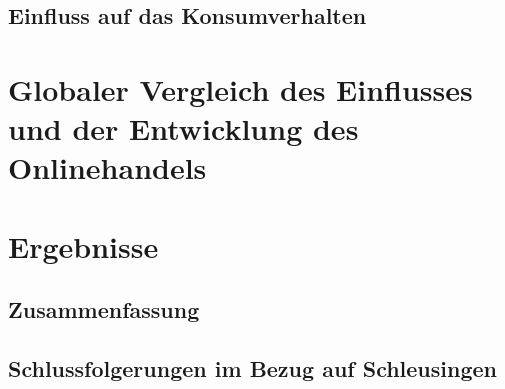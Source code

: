 \documentclass[a4paper, 12pt]{scrartcl}
\begin{document}
        \subsection{Einfluss auf das Konsumverhalten } %
            
        \newpage
            
            
            
    \section{Globaler Vergleich des Einflusses und der Entwicklung des Onlinehandels}
            
        \newpage
        
        
        
    \section{Ergebnisse}
        \subsection{Zusammenfassung}
            
            
        \subsection{Schlussfolgerungen im Bezug auf Schleusingen}
            
        \newpage
        
        
        
    
        \newpage
        
    \listoffigures
        \newpage
        
    
    
    \newpage
    
    \newpage
    
        
        
\end{document}
